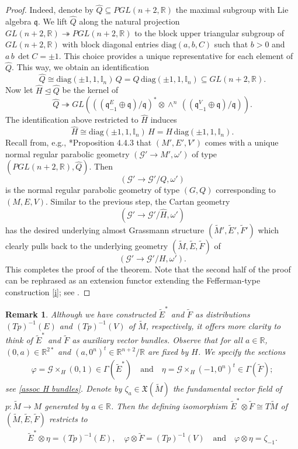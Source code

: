 \documentclass[11pt]{amsart}
\newtheorem{remark}[proposition]{Remark}
\begin{document}
\begin{proof}
Indeed, denote by $\hat Q\subseteq PGL(n+2,\mathbb R)$ the maximal subgroup with Lie algebra $\mathfrak q$. We lift $\hat Q$ along the natural projection $GL(n+2,\mathbb R)\twoheadrightarrow PGL(n+2,\mathbb R)$ to the block upper triangular subgroup of $GL(n+2,\mathbb R)$ with block diagonal entries $\mathrm{diag}(a,b,C)$ such that $b>0$ and $a\,b\,\det C=\pm 1$. This choice provides a unique representative for each element of $\hat Q$. This way, we obtain an identification
\[\hat Q\cong \mathrm{diag}(\pm1,1,\mathbb I_n)\,Q=Q\, \mathrm{diag}(\pm1,1,\mathbb I_n)\subseteq GL(n+2,\mathbb R).\]
Now let $\hat H\trianglelefteq\hat Q$ be the kernel of
\[\hat Q\twoheadrightarrow GL\left(\left((\mathfrak q_{-1}^E\oplus\mathfrak q)/\mathfrak q\right)^*\otimes\wedge^n\,\left((\mathfrak q_{-1}^V\oplus\mathfrak q)/\mathfrak q\right)\right).\]
The identification above restricted to $\hat H$ induces
\[\hat H\cong \mathrm{diag}(\pm1,1,\mathbb I_n)\,H=H\, \mathrm{diag}(\pm1,1,\mathbb I_n).\]
Recall from, e.g., \cite{Book}*{Proposition 4.4.3} that $(M',E',V')$ comes with a unique normal regular parabolic geometry $(\mathcal G'\to M',\omega')$ of type $(PGL(n+2,\mathbb R),\hat Q)$. Then
\[(\mathcal G'\to\mathcal G'/Q,\omega')\]
is the normal regular parabolic geometry of type $(G,Q)$ corresponding to $(M,E,V)$. Similar to the previous step, the Cartan geometry
\[(\mathcal G'\to\mathcal G'/\hat H,\omega')\]
has the desired underlying almost Grassmann structure $(\tilde M',\tilde E',\tilde F')$ which clearly pulls back to the underlying geometry $(\tilde M,\tilde E,\tilde F)$ of
\[(\mathcal G'\to\mathcal G'/H,\omega').\]
This completes the proof of the theorem. Note that the second half of the proof can be rephrased as an extension functor extending the Fefferman-type construction \eqref{i}; see \cite{CZ09}.
\end{proof}
\begin{remark}\label{distinguished sections}
Although we have constructed $\tilde E^*$ and $\tilde F$ as distributions $(Tp)^{-1}(E)$ and $(Tp)^{-1}(V)$ of $\tilde M$, respectively, it offers more clarity to think of $\tilde E^*$ and $\tilde F$ as auxiliary vector bundles. Observe that for all $a\in\mathbb R$, $(0,a)\in\mathbb R^{2*}$ and $(a,0^n)^t\in\mathbb R^{n+2}/\mathbb R$ are fixed by $H$. We specify the sections 
\begin{align*}
\varphi=\mathcal G\times_H(0,1)\in\Gamma(\tilde E^*)
\quad\text{and}\quad
\eta=\mathcal G\times_H(-1,0^n)^t\in\Gamma(\tilde F);
\end{align*}
see \eqref{assoc H bundles}. Denote by $\zeta_a\in\mathfrak X(\tilde M)$ the fundamental vector field of $p:\tilde M\to M$ generated by $a\in\mathbb R$. Then the defining isomorphism $\tilde E^*\otimes\tilde F\cong T\tilde M$ of $(\tilde M, \tilde E,\tilde F)$ restricts to
\begin{align*}
\tilde E^*\otimes\eta=(Tp)^{-1}(E),\quad\varphi\otimes\tilde F=(Tp)^{-1}(V)
\quad\text{and}\quad
\varphi\otimes\eta=\zeta_{-1}.
\end{align*}
\end{remark}
\end{document}
